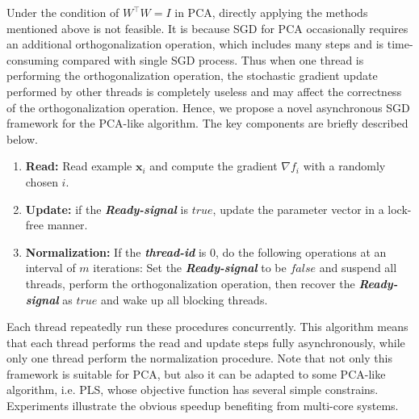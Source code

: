 \documentclass[conference]{IEEEtran}
\begin{document}
Under the condition of $W^{\top}W=I$ in PCA,  directly applying the methods mentioned above is not feasible. It is because SGD for PCA occasionally requires an additional orthogonalization operation, which includes many steps and is time-consuming compared with single SGD process. Thus when one thread is performing the orthogonalization operation, the stochastic gradient update performed by other threads is completely useless and may affect the correctness of the orthogonalization operation. 
Hence, we propose a novel asynchronous SGD framework for the PCA-like algorithm. The key components are briefly described below.
\begin{enumerate}
\item \textbf{Read:} Read example $\mathbf{x}_i$ and compute the gradient $\nabla f_{i}$ with a randomly chosen $i$.
\item \textbf{Update:} if the \emph{\textbf{Ready-signal}}  is $true$, update the parameter vector in a lock-free manner.
\item \textbf{Normalization:} If the \emph{\textbf{thread-id}} is 0, do the following operations at an interval of $m$ iterations: Set the \emph{\textbf{Ready-signal}}  to be $false$ and suspend all threads, perform the orthogonalization operation, then recover  the \emph{\textbf{Ready-signal}}  as $true$ and wake up all blocking threads.
\end{enumerate}
Each thread repeatedly run these procedures concurrently. This algorithm means that each thread performs the read and update steps fully asynchronously, while only one thread perform the normalization procedure. Note that not only this framework is suitable for PCA, but also it can be adapted to some PCA-like algorithm, i.e. PLS, whose objective function has several simple constrains. Experiments illustrate the obvious speedup benefiting from multi-core systems.
\end{document}
